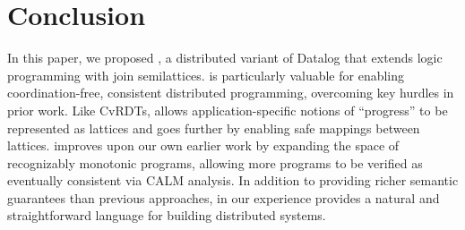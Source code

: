 \section{Conclusion}
In this paper, we proposed \lang, a distributed variant of Datalog that extends
logic programming with join semilattices. \lang is particularly valuable for
enabling coordination-free, consistent distributed programming, overcoming key
hurdles in prior work.  Like CvRDTs, \lang allows application-specific notions of
``progress'' to be represented as lattices and goes further by enabling safe
mappings between lattices.  \lang improves upon our own earlier work by
expanding the space of recognizably monotonic programs, allowing more programs
to be verified as eventually consistent via CALM analysis.  In addition to
providing richer semantic guarantees than previous approaches, in our experience
\lang provides a natural and straightforward language for building distributed
systems.

